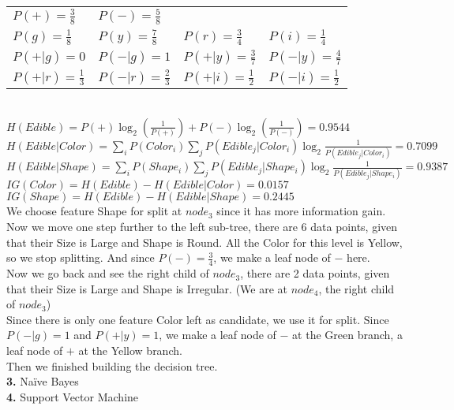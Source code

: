 \documentclass[11pt,a4paper,fleqn]{article}
\begin{document}
\begin{tabular}{llll}
$P(+) = \frac{3}{8}$&$P(-) = \frac{5}{8}$&&\\
$P(g)=\frac{1}{8}$&$P(y)=\frac{7}{8}$&$P(r)=\frac{3}{4}$&$P(i)=\frac{1}{4}$\\
$P(+|g)=0$&$P(-|g)=1$&$P(+|y)=\frac{3}{7}$&$P(-|y)=\frac{4}{7}$\\
$P(+|r)=\frac{1}{3}$&$P(-|r)=\frac{2}{3}$&$P(+|i)=\frac{1}{2}$&$P(-|i)=\frac{1}{2}$\\
\end{tabular}\\
$H(Edible) =  P(+)\log_2(\frac{1}{P(+)})+P(-)\log_2(\frac{1}{P(-)})=0.9544$\\
$H(Edible|Color) = \sum_iP(Color_i)\sum_jP(Edible_j|Color_i)\log_2\frac{1}{P(Edible_j|Color_i)}=0.7099$\\
$H(Edible|Shape) = \sum_iP(Shape_i)\sum_jP(Edible_j|Shape_i)\log_2\frac{1}{P(Edible_j|Shape_i)}=0.9387$\\
$IG(Color) = H(Edible) - H(Edible|Color) = 0.0157$\\
$IG(Shape) = H(Edible) - H(Edible|Shape) = 0.2445$\\
We choose feature Shape for split at $node_3$ since it has more information gain.\\
Now we move one step further to the left sub-tree, there are 6 data points, given that their Size is Large and Shape is Round. All the Color for this level is Yellow, so we stop splitting. And since $P(-)=\frac{3}{4}$, we make a leaf node of $-$ here.\\
Now we go back and see the right child of $node_3$, there are 2 data points, given that their Size is Large and Shape is Irregular. (We are at $node_4$, the right child of $node_3$)\\
Since there is only one feature Color left as candidate, we use it for split. Since $P(-|g)=1$ and $P(+|y) = 1$, we make a leaf node of $-$ at the Green branch, a leaf node of $+$ at the Yellow branch.\\
Then we finished building the decision tree.\\
\newpage \noindent
\textbf{3.} Na\"{i}ve Bayes\\
\textbf{4.} Support Vector Machine\\
\end{document}
